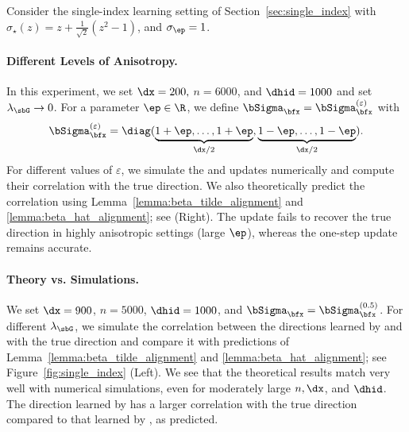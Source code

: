 Consider the single-index learning setting of Section~\ref{sec:single_index} with $\sigma_\star(z) = z + \frac{1}{\sqrt{2}} (z^2-1)$, and $\sigma_\ep =1$. 
\paragraph{Different Levels of Anisotropy.} In this experiment, we set $\dx=200,$ $n = 6000$, and $\dhid = 1000$ and set $\lambda_{\sbG}\to 0$. For a parameter $\ep \in \R$, we define $\bSigma_{\bfx} = \bSigma_{\bfx}^{(\varepsilon)}$ with
\begin{align}
    \label{eq:sigma2}
    \bSigma_{\bfx}^{(\varepsilon)} = \diag(\underbrace{1+\ep, \dots, 1+\ep}_{\dx/2}, \underbrace{1-\ep, \dots, 1-\ep}_{\dx/2}).    
\end{align}
For different values of $\varepsilon$, we simulate the \KFAC and \SGD updates numerically and compute their correlation with the true direction.  We also theoretically predict the correlation using Lemma~\ref{lemma:beta_tilde_alignment} and \ref{lemma:beta_hat_alignment}; see  (Right). The \SGD update fails to recover the true direction in highly anisotropic settings (large $\ep$), whereas the one-step \KFAC update remains  accurate.

\vspace{-0.4cm}
\paragraph{Theory vs. Simulations.} We set $\dx = 900$, $n = 5000$, $\dhid = 1000$, and $\bSigma_{\bfx} = \bSigma_{\bfx}^{(0.5)}$. For different $\lambda_{\sbG}$, we simulate the correlation between the directions learned by \KFAC and \SGD with the true direction and compare it with predictions of Lemma~\ref{lemma:beta_tilde_alignment} and \ref{lemma:beta_hat_alignment}; see Figure~\ref{fig:single_index} (Left).  We see that the theoretical results match very well with numerical simulations, even for moderately large $n, \dx$, and $\dhid$. The direction learned by \KFAC has a larger correlation with the true direction compared to that learned by \SGD, as predicted.







